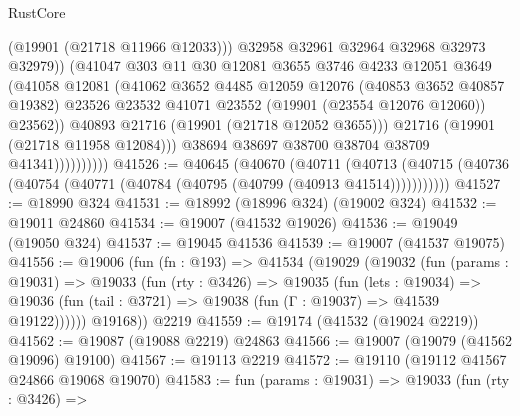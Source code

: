 \begin{lexlean}{RustCore}
\begin{coremodule}
                                (@19901 (@21718 @11966 @12033)))
                              @32958
                              @32961
                              @32964
                              @32968
                              @32973
                              @32979))
                          (@41047
                            @303
                            @11
                            @30
                            @12081
                            @3655
                            @3746
                            @4233
                            @12051
                            @3649
                            (@41058
                              @12081
                              (@41062
                                @3652
                                @4485
                                @12059
                                @12076
                                (@40853 @3652 @40857 @19382)
                                @23526
                                @23532
                                @41071
                                @23552
                                (@19901 (@23554 @12076 @12060))
                                @23562))
                            @40893
                            @21716
                            (@19901 (@21718 @12052 @3655)))
                          @21716
                          (@19901 (@21718 @11958 @12084)))
                        @38694
                        @38697
                        @38700
                        @38704
                        @38709
                        @41341))))))))))
@41526 := @40645
    (@40670
      (@40711
        (@40713 (@40715 (@40736 (@40754 (@40771 (@40784 (@40795 (@40799 (@40913 @41514)))))))))))
@41527 := @18990 @324
@41531 := @18992 (@18996 @324) (@19002 @324)
@41532 := @19011 @24860
@41534 := @19007 (@41532 @19026)
@41536 := @19049 (@19050 @324)
@41537 := @19045 @41536
@41539 := @19007 (@41537 @19075)
@41556 := @19006
    (fun (fn : @193) =>
    @41534
      (@19029
        (@19032
          (fun (params : @19031) =>
          @19033
            (fun (rty : @3426) =>
            @19035
              (fun (lets : @19034) =>
              @19036 (fun (tail : @3721) => @19038 (fun (Γ : @19037) => @41539 @19122))))))
        @19168))
    @2219
@41559 := @19174 (@41532 (@19024 @2219))
@41562 := @19087 (@19088 @2219) @24863
@41566 := @19007 (@19079 (@41562 @19096) @19100)
@41567 := @19113 @2219
@41572 := @19110 (@19112 @41567 @24866 @19068 @19070)
@41583 := fun (params : @19031) =>
  @19033
    (fun (rty : @3426) =>

\end{coremodule}
\end{lexlean}
